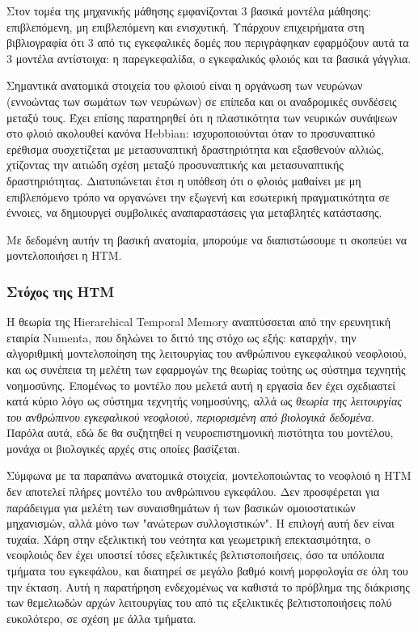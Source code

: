   Στον τομέα της μηχανικής μάθησης εμφανίζονται 3 βασικά μοντέλα μάθησης: επιβλεπόμενη, μη επιβλεπόμενη και ενισχυτική.
  Υπάρχουν επιχειρήματα στη βιβλιογραφία \parencite{doyaWhatAreComputations1999} ότι 3 από τις εγκεφαλικές δομές που περιγράφηκαν εφαρμόζουν
  αυτά τα 3 μοντέλα αντίστοιχα: η παρεγκεφαλίδα, ο εγκεφαλικός φλοιός και τα βασικά γάγγλια.

  Σημαντικά ανατομικά στοιχεία του φλοιού είναι η οργάνωση των νευρώνων (εννοώντας των σωμάτων των νευρώνων) σε επίπεδα και οι αναδρομικές συνδέσεις μεταξύ τους.
  Έχει επίσης παρατηρηθεί ότι η πλαστικότητα των νευρικών συνάψεων στο φλοιό ακολουθεί κανόνα Hebbian:
  ισχυροποιούνται όταν το προσυναπτικό ερέθισμα συσχετίζεται με μετασυναπτική δραστηριότητα και εξασθενούν αλλιώς,
  χτίζοντας την αιτιώδη σχέση μεταξύ προσυναπτικής και μετασυναπτικής δραστηριότητας.
  Διατυπώνεται έτσι η υπόθεση ότι ο φλοιός μαθαίνει με μη επιβλεπόμενο τρόπο να οργανώνει την εξωγενή και εσωτερική πραγματικότητα σε έννοιες,
  να δημιουργεί συμβολικές αναπαραστάσεις για μεταβλητές κατάστασης.

  Με δεδομένη αυτήν τη βασική ανατομία, μπορούμε να διαπιστώσουμε τι σκοπεύει να μοντελοποιήσει η HTM.

\subsubsection{Στόχος της HTM}

  Η θεωρία της Hierarchical Temporal Memory αναπτύσσεται από την ερευνητική εταιρία Numenta, που δηλώνει το διττό της στόχο ως εξής:
  καταρχήν, την αλγοριθμική μοντελοποίηση της λειτουργίας του ανθρώπινου εγκεφαλικού νεοφλοιού,
  και ως συνέπεια τη μελέτη των εφαρμογών της θεωρίας τούτης ως σύστημα τεχνητής νοημοσύνης.
  Επομένως το μοντέλο που μελετά αυτή η εργασία δεν έχει σχεδιαστεί κατά κύριο λόγο ως σύστημα τεχνητής νοημοσύνης,
  αλλά ως \textit{θεωρία της λειτουργίας του ανθρώπινου εγκεφαλικού νεοφλοιού, περιορισμένη από βιολογικά δεδομένα}.
  Παρόλα αυτά, εδώ δε θα συζητηθεί η νευροεπιστημονική πιστότητα του μοντέλου, μονάχα οι βιολογικές αρχές στις οποίες βασίζεται.

  Σύμφωνα με τα παραπάνω ανατομικά στοιχεία, μοντελοποιώντας το νεοφλοιό η HTM δεν αποτελεί πλήρες μοντέλο
  του ανθρώπινου εγκεφάλου. Δεν προσφέρεται για παράδειγμα για μελέτη των συναισθημάτων ή των βασικών ομοιοστατικών
  μηχανισμών, αλλά μόνο των "ανώτερων συλλογιστικών". Η επιλογή αυτή δεν είναι τυχαία. Χάρη στην εξελικτική του νεότητα και
  γεωμετρική επεκτασιμότητα, ο νεοφλοιός δεν έχει υποστεί τόσες εξελικτικές βελτιστοποιήσεις, όσο τα υπόλοιπα τμήματα του εγκεφάλου,
  και διατηρεί σε μεγάλο βαθμό κοινή μορφολογία σε όλη του την έκταση. Αυτή η παρατήρηση ενδεχομένως να καθιστά το πρόβλημα
  της διάκρισης των θεμελιωδών αρχών λειτουργίας του από τις εξελικτικές βελτιστοποιήσεις πολύ ευκολότερο, σε σχέση με άλλα τμήματα.

